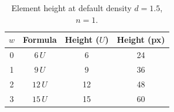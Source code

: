 \begin{table}[ht]
\centering
\caption{Element height at default density $d = 1.5$, $n = 1$.}
\label{tab:height-reference}
\begin{tabular}{cccc}
\toprule
$w$ & Formula & Height ($U$) & Height (px) \\
\midrule
0 & $6\,U$ & 6 & 24 \\
1 & $9\,U$ & 9 & 36 \\
2 & $12\,U$ & 12 & 48 \\
3 & $15\,U$ & 15 & 60 \\
\bottomrule
\end{tabular}
\end{table}

